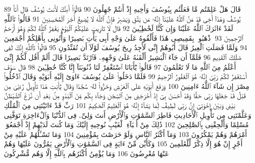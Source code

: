 {\tiny\colorbox{cl_aya}{89}} قَالَ هَلْ عَلِمْتُم مَّا فَعَلْتُم بِيُوسُفَ وَأَخِيهِ إِذْ أَنتُمْ جَٰهِلُونَ
{\tiny\colorbox{cl_aya}{90}} قَالُوٓا۟ أَءِنَّكَ لَأَنتَ يُوسُفُ قَالَ أَنَا۠ يُوسُفُ وَهَٰذَآ أَخِى قَدْ مَنَّ ٱللَّهُ عَلَيْنَآ إِنَّهُۥ مَن يَتَّقِ وَيَصْبِرْ فَإِنَّ ٱللَّهَ لَا يُضِيعُ أَجْرَ ٱلْمُحْسِنِينَ
{\tiny\colorbox{cl_aya}{91}} قَالُوا۟ تَٱللَّهِ لَقَدْ ءَاثَرَكَ ٱللَّهُ عَلَيْنَا وَإِن كُنَّا لَخَٰطِـِٔينَ
{\tiny\colorbox{cl_aya}{92}} قَالَ لَا تَثْرِيبَ عَلَيْكُمُ ٱلْيَوْمَ يَغْفِرُ ٱللَّهُ لَكُمْ وَهُوَ أَرْحَمُ ٱلرَّٰحِمِينَ
{\tiny\colorbox{cl_aya}{93}} ٱذْهَبُوا۟ بِقَمِيصِى هَٰذَا فَأَلْقُوهُ عَلَىٰ وَجْهِ أَبِى يَأْتِ بَصِيرًا وَأْتُونِى بِأَهْلِكُمْ أَجْمَعِينَ
{\tiny\colorbox{cl_aya}{94}} وَلَمَّا فَصَلَتِ ٱلْعِيرُ قَالَ أَبُوهُمْ إِنِّى لَأَجِدُ رِيحَ يُوسُفَ لَوْلَآ أَن تُفَنِّدُونِ
{\tiny\colorbox{cl_aya}{95}} قَالُوا۟ تَٱللَّهِ إِنَّكَ لَفِى ضَلَٰلِكَ ٱلْقَدِيمِ
{\tiny\colorbox{cl_aya}{96}} فَلَمَّآ أَن جَآءَ ٱلْبَشِيرُ أَلْقَىٰهُ عَلَىٰ وَجْهِهِۦ فَٱرْتَدَّ بَصِيرًا قَالَ أَلَمْ أَقُل لَّكُمْ إِنِّىٓ أَعْلَمُ مِنَ ٱللَّهِ مَا لَا تَعْلَمُونَ
{\tiny\colorbox{cl_aya}{97}} قَالُوا۟ يَٰٓأَبَانَا ٱسْتَغْفِرْ لَنَا ذُنُوبَنَآ إِنَّا كُنَّا خَٰطِـِٔينَ
{\tiny\colorbox{cl_aya}{98}} قَالَ سَوْفَ أَسْتَغْفِرُ لَكُمْ رَبِّىٓ إِنَّهُۥ هُوَ ٱلْغَفُورُ ٱلرَّحِيمُ
{\tiny\colorbox{cl_aya}{99}} فَلَمَّا دَخَلُوا۟ عَلَىٰ يُوسُفَ ءَاوَىٰٓ إِلَيْهِ أَبَوَيْهِ وَقَالَ ٱدْخُلُوا۟ مِصْرَ إِن شَآءَ ٱللَّهُ ءَامِنِينَ
{\tiny\colorbox{cl_aya}{100}} وَرَفَعَ أَبَوَيْهِ عَلَى ٱلْعَرْشِ وَخَرُّوا۟ لَهُۥ سُجَّدًا وَقَالَ يَٰٓأَبَتِ هَٰذَا تَأْوِيلُ رُءْيَٰىَ مِن قَبْلُ قَدْ جَعَلَهَا رَبِّى حَقًّا وَقَدْ أَحْسَنَ بِىٓ إِذْ أَخْرَجَنِى مِنَ ٱلسِّجْنِ وَجَآءَ بِكُم مِّنَ ٱلْبَدْوِ مِنۢ بَعْدِ أَن نَّزَغَ ٱلشَّيْطَٰنُ بَيْنِى وَبَيْنَ إِخْوَتِىٓ إِنَّ رَبِّى لَطِيفٌ لِّمَا يَشَآءُ إِنَّهُۥ هُوَ ٱلْعَلِيمُ ٱلْحَكِيمُ
{\tiny\colorbox{cl_aya}{101}} رَبِّ قَدْ ءَاتَيْتَنِى مِنَ ٱلْمُلْكِ وَعَلَّمْتَنِى مِن تَأْوِيلِ ٱلْأَحَادِيثِ فَاطِرَ ٱلسَّمَٰوَٰتِ وَٱلْأَرْضِ أَنتَ وَلِىِّۦ فِى ٱلدُّنْيَا وَٱلْءَاخِرَةِ تَوَفَّنِى مُسْلِمًا وَأَلْحِقْنِى بِٱلصَّٰلِحِينَ
{\tiny\colorbox{cl_aya}{102}} ذَٰلِكَ مِنْ أَنۢبَآءِ ٱلْغَيْبِ نُوحِيهِ إِلَيْكَ وَمَا كُنتَ لَدَيْهِمْ إِذْ أَجْمَعُوٓا۟ أَمْرَهُمْ وَهُمْ يَمْكُرُونَ
{\tiny\colorbox{cl_aya}{103}} وَمَآ أَكْثَرُ ٱلنَّاسِ وَلَوْ حَرَصْتَ بِمُؤْمِنِينَ
{\tiny\colorbox{cl_aya}{104}} وَمَا تَسْـَٔلُهُمْ عَلَيْهِ مِنْ أَجْرٍ إِنْ هُوَ إِلَّا ذِكْرٌ لِّلْعَٰلَمِينَ
{\tiny\colorbox{cl_aya}{105}} وَكَأَيِّن مِّنْ ءَايَةٍ فِى ٱلسَّمَٰوَٰتِ وَٱلْأَرْضِ يَمُرُّونَ عَلَيْهَا وَهُمْ عَنْهَا مُعْرِضُونَ
{\tiny\colorbox{cl_aya}{106}} وَمَا يُؤْمِنُ أَكْثَرُهُم بِٱللَّهِ إِلَّا وَهُم مُّشْرِكُونَ
